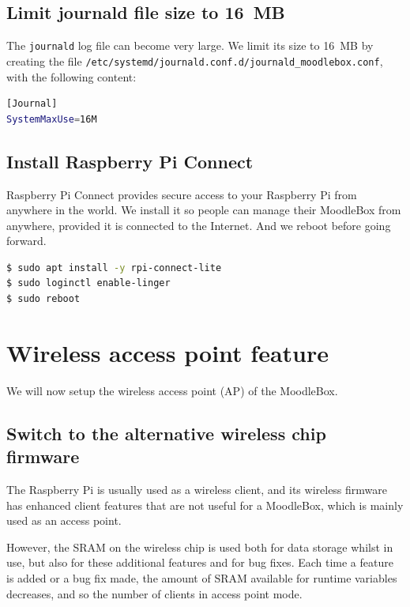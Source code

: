 \documentclass[12pt]{article}
\begin{document}
\subsection{Limit journald file size to 16~MB}

The \lstinline{journald} log file can become very large.
We limit its size to 16~MB by creating the file \lstinline{/etc/systemd/journald.conf.d/journald_moodlebox.conf}, with the following content:\begin{lstlisting}[language=bash]
[Journal]
SystemMaxUse=16M
\end{lstlisting}

\subsection{Install Raspberry Pi Connect}

Raspberry Pi Connect provides secure access to your Raspberry Pi from anywhere in the world.
We install it so people can manage their MoodleBox from anywhere, provided it is connected to the Internet.
And we reboot before going forward.

\begin{lstlisting}[language=bash]
$ sudo apt install -y rpi-connect-lite
$ sudo loginctl enable-linger
$ sudo reboot
\end{lstlisting}

\section{Wireless access point feature}

We will now setup the wireless access point (AP) of the MoodleBox.

\subsection{Switch to the alternative wireless chip firmware}

The Raspberry Pi is usually used as a wireless client, and its wireless firmware has enhanced client features that are not useful for a MoodleBox, which is mainly used as an access point.

However, the SRAM on the wireless chip is used both for data storage whilst in use, but also for these additional features and for bug fixes.
Each time a feature is added or a bug fix made, the amount of SRAM available for runtime variables decreases, and so the number of clients in access point mode.
\end{document}
